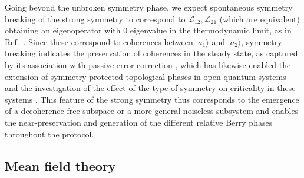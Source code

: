 Going beyond the unbroken symmetry phase, we expect spontaneous symmetry breaking of the strong symmetry to correspond to $\mathcal{L}_{12},\mathcal{L}_{21}$ (which are equivalent) obtaining an eigenoperator with 0 eigenvalue in the thermodynamic limit, as in Ref.~\cite{Lieu2020}. Since these correspond to coherences between $|a_1\rangle$ and $|a_2\rangle$, symmetry breaking indicates the preservation of coherences in the steady state, as captured by its association with passive error correction \cite{Lieu2020,Liu2023}, which has likewise enabled the extension of symmetry protected topological phases in open quantum systems \cite{deGroot2022} and the investigation of the effect of the type of symmetry on criticality in these systems \cite{Minganti2023}. This feature of the strong symmetry thus corresponds to the emergence of a decoherence free subspace or a more general noiseless subsystem \cite{Lidar1998, Knill2000, Albert2014, Lieu2020} and enables the near-preservation and generation of the different relative Berry phases throughout the protocol. 


\subsection{Mean field theory}

